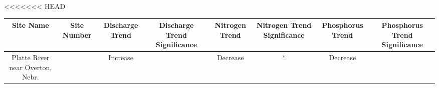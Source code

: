 \documentclass[12pt,]{article}
\begin{document}
<<<<<<< HEAD
\begin{longtable}[]{@{}cccccccc@{}}
\toprule
\begin{minipage}[b]{0.06\columnwidth}\centering
Site Name\strut
\end{minipage} & \begin{minipage}[b]{0.07\columnwidth}\centering
Site Number\strut
\end{minipage} & \begin{minipage}[b]{0.08\columnwidth}\centering
Discharge Trend\strut
\end{minipage} & \begin{minipage}[b]{0.13\columnwidth}\centering
Discharge Trend Significance\strut
\end{minipage} & \begin{minipage}[b]{0.08\columnwidth}\centering
Nitrogen Trend\strut
\end{minipage} & \begin{minipage}[b]{0.16\columnwidth}\centering
Nitrogen Trend Significance\strut
\end{minipage} & \begin{minipage}[b]{0.09\columnwidth}\centering
Phosphorus Trend\strut
\end{minipage} & \begin{minipage}[b]{0.13\columnwidth}\centering
Phosphorus Trend Significance\strut
\end{minipage}\tabularnewline
\midrule
\endhead
\begin{minipage}[t]{0.06\columnwidth}\centering
Platte River near Overton, Nebr.\strut
\end{minipage} & \begin{minipage}[t]{0.07\columnwidth}\centering
06768000\strut
\end{minipage} & \begin{minipage}[t]{0.08\columnwidth}\centering
Increase\strut
\end{minipage} & \begin{minipage}[t]{0.13\columnwidth}\centering
\strut
\end{minipage} & \begin{minipage}[t]{0.08\columnwidth}\centering
Decrease\strut
\end{minipage} & \begin{minipage}[t]{0.16\columnwidth}\centering
*\strut
\end{minipage} & \begin{minipage}[t]{0.09\columnwidth}\centering
Decrease\strut
\end{minipage} & \begin{minipage}[t]{0.13\columnwidth}\centering

\end{minipage}
\end{longtable}
\end{document}
